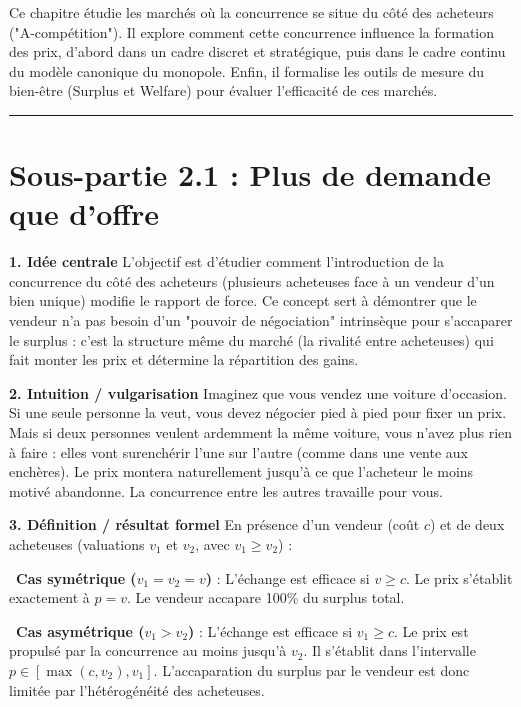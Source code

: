 \documentclass[11pt, a4paper]{report}
\begin{document}
Ce chapitre étudie les marchés où la concurrence se situe du côté des acheteurs ("A-compétition"). Il explore comment cette concurrence influence la formation des prix, d'abord dans un cadre discret et stratégique, puis dans le cadre continu du modèle canonique du monopole. Enfin, il formalise les outils de mesure du bien-être (Surplus et Welfare) pour évaluer l'efficacité de ces marchés.

\vspace{1cm}\hrule\vspace{1cm}

\section{Sous-partie 2.1 : Plus de demande que d'offre}

\textbf{1. Idée centrale}
L'objectif est d'étudier comment l'introduction de la concurrence du côté des acheteurs (plusieurs acheteuses face à un vendeur d'un bien unique) modifie le rapport de force. Ce concept sert à démontrer que le vendeur n'a pas besoin d'un "pouvoir de négociation" intrinsèque pour s'accaparer le surplus : c'est la structure même du marché (la rivalité entre acheteuses) qui fait monter les prix et détermine la répartition des gains.

\textbf{2. Intuition / vulgarisation}
Imaginez que vous vendez une voiture d'occasion. Si une seule personne la veut, vous devez négocier pied à pied pour fixer un prix. Mais si deux personnes veulent ardemment la même voiture, vous n'avez plus rien à faire : elles vont surenchérir l'une sur l'autre (comme dans une vente aux enchères). Le prix montera naturellement jusqu'à ce que l'acheteur le moins motivé abandonne. La concurrence entre les autres travaille pour vous.

\textbf{3. Définition / résultat formel}
En présence d'un vendeur (coût $c$) et de deux acheteuses (valuations $v_1$ et $v_2$, avec $v_1 \ge v_2$) :
\par \textbullet\ \textbf{Cas symétrique ($v_1 = v_2 = v$)} : L'échange est efficace si $v \ge c$. Le prix s'établit exactement à $p = v$. Le vendeur accapare 100\% du surplus total.
\par \textbullet\ \textbf{Cas asymétrique ($v_1 > v_2$)} : L'échange est efficace si $v_1 \ge c$. Le prix est propulsé par la concurrence au moins jusqu'à $v_2$. Il s'établit dans l'intervalle $p \in [\max(c, v_2), v_1]$. L'accaparation du surplus par le vendeur est donc limitée par l'hétérogénéité des acheteuses.
\end{document}

